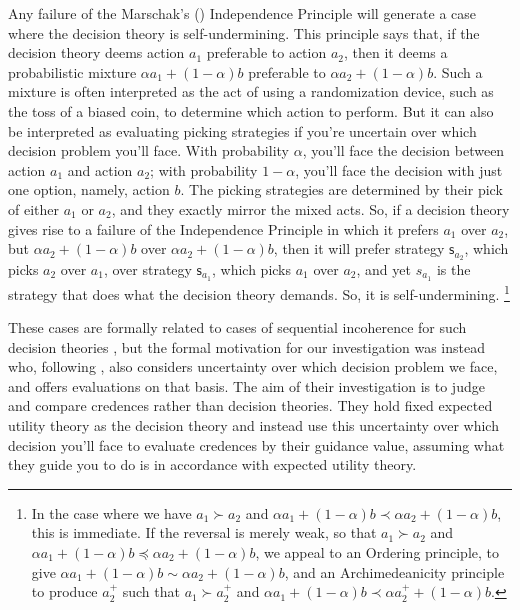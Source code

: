 \documentclass[a4paper]{article}
\newcommand\s{\mathsf{s}}
\newenvironment{CCM rewritten}
{\begingroup\color{blue}} %
{\endgroup}              %
\begin{document}
Any failure of the Marschak's (\citeyear{marschak1950rb}) Independence Principle will generate a case where the decision theory is self-undermining.
This principle says that, if the decision theory deems action $a_1$ preferable to action $a_2$, then it deems a probabilistic mixture $\alpha a_1+(1-\alpha)b$ preferable to $\alpha a_2+(1-\alpha)b$. 
Such a mixture is often interpreted as the act of using a randomization device, such as the toss of a biased coin, to determine which action to perform. 
But it can also be interpreted as evaluating picking strategies if you're uncertain over which decision problem you'll face. With probability $\alpha$, you'll face the decision between action $a_1$ and action $a_2$; with probability $1-\alpha$, you'll face the decision with just one option, namely, action $b$. The picking strategies are determined by their pick of either $a_1$ or $a_2$, and they exactly mirror the mixed acts. So, if a decision theory gives rise to a failure of the Independence Principle in which it prefers $a_1$ over $a_2$, but $\alpha a_2+(1-\alpha)b$ over $\alpha a_2+(1-\alpha)b$, then it will prefer strategy $\s_{a_2}$, which picks $a_2$ over $a_1$, over strategy $\s_{a_1}$, which picks $a_1$ over $a_2$, and yet $s_{a_1}$ is the strategy that does what the decision theory demands. So, it is self-undermining.%
\footnote{
	In the case where we have $a_1\succ a_2$ and $\alpha a_1 +(1-\alpha)b\prec \alpha a_2 + (1-\alpha)b$, this is immediate. 
	If the reversal is merely weak, so that $a_1\succ a_2$ and $\alpha a_1 +(1-\alpha)b\preceq \alpha a_2 + (1-\alpha)b$, we appeal to an Ordering principle, to give $\alpha a_1 +(1-\alpha)b\sim \alpha a_2 + (1-\alpha)b$, and an Archimedeanicity principle to produce $a^+_2$ such that $a_1\succ a^+_2$ and $\alpha a_1 +(1-\alpha)b\prec \alpha a^+_2 + (1-\alpha)b$. 
}

These cases are formally related to cases of sequential incoherence for such decision theories \citep{hammond1988cfeu,machina1989}, but the formal motivation for our investigation was instead \citet{levinstein2017pgeu} who, following \citet{schervish2009psr}, also considers uncertainty over which decision problem we face, and offers evaluations on that basis. 
The aim of their investigation is to judge and compare credences rather than decision theories.
They hold fixed expected utility theory as the decision theory and instead use this uncertainty over which decision you'll face to evaluate credences by their guidance value, assuming what they guide you to do is in accordance with expected utility theory. 
\end{document}
